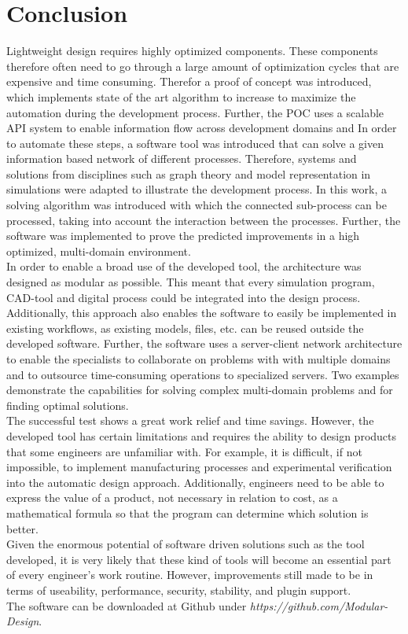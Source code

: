 \section{Conclusion}

Lightweight design requires highly optimized components.
These components therefore often need to go through a large amount of optimization cycles that are expensive and time consuming.
Therefor a proof of concept was introduced, which implements state of the art algorithm to increase to maximize the automation during the development process.
Further, the POC uses a scalable API system to enable information flow across development domains and 
In order to automate these steps, a software tool was introduced that can solve a given information based network of different processes.
Therefore, systems and solutions from disciplines such as graph theory and model representation in simulations were adapted to illustrate the development process.
In this work, a solving algorithm was introduced with which the connected sub-process can be processed, taking into account the interaction between the processes.
Further, the software was implemented to prove the predicted improvements in a high optimized, multi-domain environment.\\
In order to enable a broad use of the developed tool, the architecture was designed as modular as possible.
This meant that every simulation program, CAD-tool and digital process could be integrated into the design process.
Additionally, this approach also enables the software to easily be implemented in existing workflows, as existing models, files, etc. can be reused outside the developed software.
Further, the software uses a server-client network architecture to enable the specialists to collaborate on problems with with multiple domains and to outsource time-consuming operations to specialized servers.
Two examples demonstrate the capabilities for solving complex multi-domain problems and for finding optimal solutions.\\
The successful test shows a great work relief and time savings.
However, the developed tool has certain limitations and requires the ability to design products that some engineers are unfamiliar with.
For example, it is difficult, if not impossible, to implement manufacturing processes and experimental verification into the automatic design approach.
Additionally, engineers need to be able to express the value of a product, not necessary in relation to cost, as a mathematical formula so that the program can determine which solution is better.\\
Given the enormous potential of software driven solutions such as the tool developed, it is very likely that these kind of tools will become an essential part of every engineer's work routine.
However, improvements still made to be in terms of useability, performance, security, stability, and plugin support.\\

The software can be downloaded at Github under \emph{https://github.com/Modular-Design}.